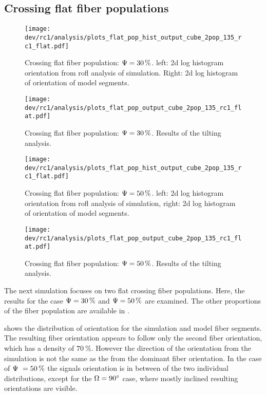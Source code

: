 \subsection{Crossing flat fiber populations}
\label{sec:resCrossFlat}
%
\begin{figure}[!t]
\centering
\texttt{[image: dev/rc1/analysis/plots\_flat\_pop\_hist\_output\_cube\_2pop\_135\_rc1\_flat.pdf]}
\caption{Crossing flat fiber population: $\textnormal{$\Psi$}=\SI{30}{\percent}$. left: 2d log histogram orientation from rofl analysis of simulation. Right: 2d log histogram of orientation of model segments.}
\label{fig:flat_03_fiber_pop_hist}
\end{figure}
%
\begin{figure}[!p]
\centering
\texttt{[image: dev/rc1/analysis/plots\_flat\_pop\_output\_cube\_2pop\_135\_rc1\_flat.pdf]}
\caption{Crossing flat fiber population: $\textnormal{$\Psi$}=\SI{30}{\percent}$. Results of the tilting analysis. }
\label{fig:flat_03_fiber_pop_rofl}
\end{figure}
%
\begin{figure}[!t]
\centering
\texttt{[image: dev/rc1/analysis/plots\_flat\_pop\_hist\_output\_cube\_2pop\_135\_rc1\_flat.pdf]}
\caption{Crossing flat fiber population: $\modelPsi=\SI{50}{\percent}$. left: 2d log histogram orientation from rofl analysis of simulation, right: 2d log histogram of orientation of model segments.}
\label{fig:flat_05_fiber_pop_hist}
\end{figure}
%
\begin{figure}[!p]
\centering
\texttt{[image: dev/rc1/analysis/plots\_flat\_pop\_output\_cube\_2pop\_135\_rc1\_flat.pdf]}
\caption{Crossing flat fiber population: $\modelPsi=\SI{50}{\percent}$. Results of the tilting analysis. }
\label{fig:flat_05_fiber_pop_rofl}
\end{figure}
%
The next simulation focuses on two flat crossing fiber populations.
Here, the results for the case $\textnormal{$\Psi$} = \SI{30}{\percent}$ and $\modelPsi = \SI{50}{\percent}$ are examined.
The other proportions of the fiber population are available in .
\par
%
 shows the distribution of orientation for the simulation and model fiber segments.
The resulting fiber orientation appears to follow only the second fiber orientation, which has a density of $\SI{70}{\percent}$.
However the direction of the orientation from the simulation is not the same as the from the dominant fiber orientation.
In the case of $\modelPsi = \SI{50}{\percent}$ the signals orientation is in between of the two individual distributions, except for the $\textnormal{$\Omega$} = \SI{90}{\degree}$ case, where mostly inclined resulting orientations are visible.
